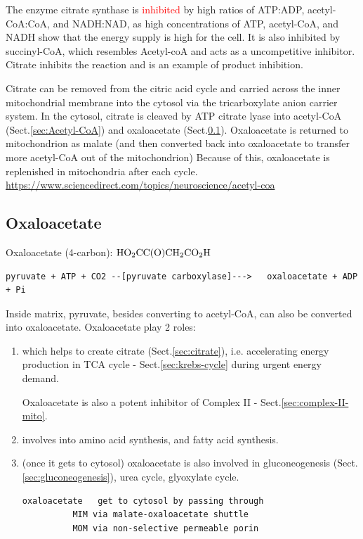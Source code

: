 The enzyme citrate synthase is \textcolor{red}{inhibited} by high ratios of
ATP:ADP, acetyl-CoA:CoA, and NADH:NAD, as high concentrations of ATP,
acetyl-CoA, and NADH show that the energy supply is high for the cell. It is
also inhibited by succinyl-CoA, which resembles Acetyl-coA and acts as a
uncompetitive inhibitor.
Citrate inhibits the reaction and is an example of product inhibition.

Citrate can be removed from the citric acid cycle and carried across the inner
mitochondrial membrane into the cytosol via the tricarboxylate anion carrier
system. In the cytosol, citrate is cleaved by ATP citrate lyase into acetyl-CoA
(Sect.\ref{sec:Acetyl-CoA}) and oxaloacetate (Sect.\ref{sec:oxaloacetate}).
Oxaloacetate is returned to mitochondrion as malate (and then converted back
into oxaloacetate to transfer more acetyl-CoA out of the mitochondrion)
Because of this, oxaloacetate is replenished in mitochondria after each cycle.
\url{https://www.sciencedirect.com/topics/neuroscience/acetyl-coa}


\subsection{Oxaloacetate}
\label{sec:oxaloacetate}

Oxaloacetate (4-carbon): $\ce{HO2CC(O)CH2CO2H}$
\begin{verbatim}
pyruvate + ATP + CO2 --[pyruvate carboxylase]--->   oxaloacetate + ADP + Pi
\end{verbatim}

Inside matrix, pyruvate, besides converting to acetyl-CoA, can also be converted
into oxaloacetate. Oxaloacetate play 2 roles:
\begin{enumerate}
  \item  which helps to create citrate
(Sect.\ref{sec:citrate}), i.e. accelerating energy production in TCA cycle -
Sect.\ref{sec:krebs-cycle} during urgent energy demand.


Oxaloacetate is also a potent inhibitor of Complex II -
Sect.\ref{sec:complex-II-mito}.

  \item involves into amino acid synthesis,   and fatty acid synthesis.

  \item (once it gets to cytosol) oxaloacetate is also involved in
  gluconeogenesis (Sect.\ref{sec:gluconeogenesis}), urea cycle, glyoxylate
  cycle.

\begin{verbatim}
oxaloacetate   get to cytosol by passing through
          MIM via malate-oxaloacetate shuttle
          MOM via non-selective permeable porin
\end{verbatim}

\end{enumerate}

